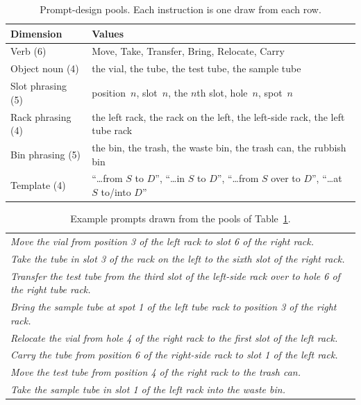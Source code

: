 \documentclass[11pt]{article}
\begin{document}
\begin{table}[H]
  \centering
  \caption{Prompt-design pools. Each instruction is one draw from each row.}
  \label{tab:prompts}
  \begin{tabular}{l p{}}
    \toprule
    \textbf{Dimension} & \textbf{Values} \\
    \midrule
    Verb (6)          & Move, Take, Transfer, Bring, Relocate, Carry \\
    Object noun (4)   & the vial, the tube, the test tube, the sample tube \\
    Slot phrasing (5) & position~$n$, slot~$n$, the $n$th slot, hole~$n$, spot~$n$ \\
    Rack phrasing (4) & the left rack, the rack on the left, the left-side rack, the left tube rack \\
    Bin phrasing (5)  & the bin, the trash, the waste bin, the trash can, the rubbish bin \\
    Template (4)      & ``\ldots from $S$ to $D$'', ``\ldots in $S$ to $D$'', ``\ldots from $S$ over to $D$'', ``\ldots at $S$ to/into $D$'' \\
    \bottomrule
  \end{tabular}
\end{table}

\begin{table}[H]
  \centering
  \caption{Example prompts drawn from the pools of Table~\ref{tab:prompts}.}
  \label{tab:examples}
  \begin{tabular}{p{}}
    \toprule
    \emph{Move the vial from position 3 of the left rack to slot 6 of the right rack.} \\
    \emph{Take the tube in slot 3 of the rack on the left to the sixth slot of the right rack.} \\
    \emph{Transfer the test tube from the third slot of the left-side rack over to hole 6 of the right tube rack.} \\
    \emph{Bring the sample tube at spot 1 of the left tube rack to position 3 of the right rack.} \\
    \emph{Relocate the vial from hole 4 of the right rack to the first slot of the left rack.} \\
    \emph{Carry the tube from position 6 of the right-side rack to slot 1 of the left rack.} \\
    \emph{Move the test tube from position 4 of the right rack to the trash can.} \\
    \emph{Take the sample tube in slot 1 of the left rack into the waste bin.} \\
    \bottomrule
  \end{tabular}
\end{table}
\end{document}
